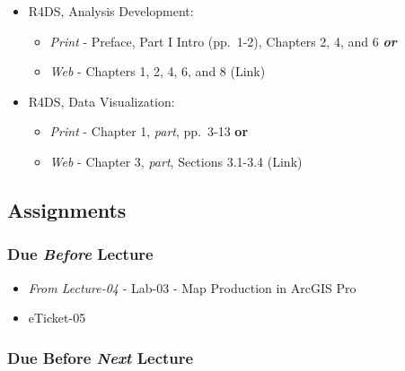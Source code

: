 \documentclass[
]{book}
\providecommand{\tightlist}{%
  \setlength{\itemsep}{0pt}\setlength{\parskip}{0pt}}
\begin{document}
\begin{itemize}
\tightlist
\item
  R4DS, Analysis Development:

  \begin{itemize}
  \tightlist
  \item
    \emph{Print} - Preface, Part I Intro (pp.~1-2), Chapters 2, 4, and 6 \textbf{\emph{or}}
  \item
    \emph{Web} - Chapters 1, 2, 4, 6, and 8 (Link)
  \end{itemize}
\item
  R4DS, Data Visualization:

  \begin{itemize}
  \tightlist
  \item
    \emph{Print} - Chapter 1, \emph{part}, pp.~3-13 \textbf{or}
  \item
    \emph{Web} - Chapter 3, \emph{part}, Sections 3.1-3.4 (Link)
  \end{itemize}
\end{itemize}

\hypertarget{assignments-6}{%
\subsection*{Assignments}\label{assignments-6}}

\hypertarget{due-before-lecture-4}{%
\subsubsection*{\texorpdfstring{Due \emph{Before} Lecture}{Due Before Lecture}}\label{due-before-lecture-4}}

\begin{itemize}
\tightlist
\item
  \emph{From Lecture-04} - Lab-03 - Map Production in ArcGIS Pro
\item
  eTicket-05
\end{itemize}

\hypertarget{due-before-next-lecture-3}{%
\subsubsection*{\texorpdfstring{Due Before \emph{Next} Lecture}{Due Before Next Lecture}}\label{due-before-next-lecture-3}}
\end{document}

